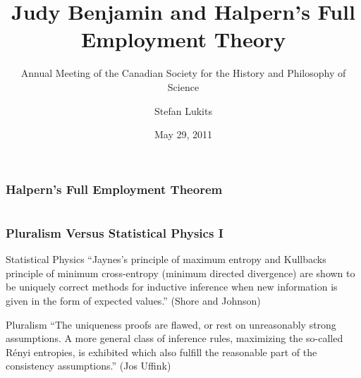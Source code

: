 \documentclass[xcolor=dvipsnames]{beamer}
\title{Judy Benjamin and Halpern's \linebreak Full Employment Theory}
\subtitle{Annual Meeting of the Canadian Society \linebreak
  for the History and Philosophy of Science}
\author{Stefan Lukits}
\date{May 29, 2011}
\begin{document}
\begin{frame}
  \titlepage
\end{frame}

\begin{frame}
  \frametitle{Halpern's Full Employment Theorem}
  \begin{columns}
  \end{columns}
\end{frame}

\begin{frame}
  \frametitle{Pluralism Versus Statistical Physics I}
  \begin{block}{Statistical Physics}
    ``Jaynes's principle of maximum entropy and Kullbacks
    principle of minimum cross-entropy (minimum directed
    divergence) are shown to be uniquely correct methods for
    inductive inference when new information is given in the form
    of expected values.'' (Shore and Johnson)
  \end{block}
  \begin{block}{Pluralism}
    ``The uniqueness proofs are flawed, or rest on unreasonably
    strong assumptions. A more general class of inference rules,
    maximizing the so-called R{\'e}nyi entropies, is exhibited
    which also fulfill the reasonable part of the consistency
    assumptions.'' (Jos Uffink)
  \end{block}
\end{frame}
\end{document}
